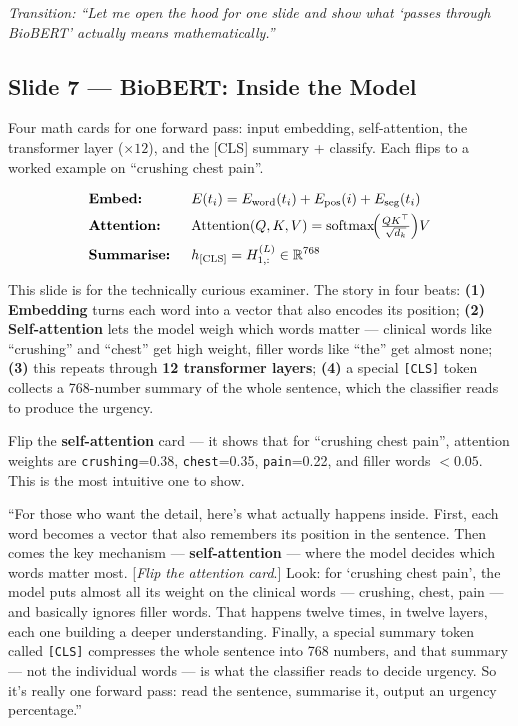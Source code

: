 \documentclass[11pt]{article}
\newcommand{\transition}[1]{\medskip\noindent\textit{\textcolor{mutel}{Transition: #1}}\medskip}
\newcommand{\route}[1]{{\small\texttt{\textcolor{mutel}{#1}}}}
\newcommand{\slide}[3]{%
  \subsection{Slide #1 --- #2}%
  \noindent\route{Route: #3}\par\smallskip}
\begin{document}
\transition{``Let me open the hood for one slide and show what `passes through BioBERT' actually means mathematically.''}

\slide{7}{BioBERT: Inside the Model}{/dashboard/math/biobert-inference}

\begin{onscreen}
Four math cards for one forward pass: input embedding, self-attention, the transformer layer ($\times 12$),
and the [CLS] summary + classify. Each flips to a worked example on ``crushing chest pain''.
\end{onscreen}

\begin{align*}
&\textbf{Embed: } && E(t_i) = E_{\text{word}}(t_i) + E_{\text{pos}}(i) + E_{\text{seg}}(t_i)\\
&\textbf{Attention: } && \mathrm{Attention}(Q,K,V) = \mathrm{softmax}\!\Bigl(\tfrac{QK^\top}{\sqrt{d_k}}\Bigr)V\\
&\textbf{Summarise: } && h_{\mathrm{[CLS]}} = H^{(L)}_{1,:}\in\mathbb{R}^{768}
\end{align*}

\begin{idea}
This slide is for the technically curious examiner. The story in four beats: \textbf{(1) Embedding} turns
each word into a vector that also encodes its position; \textbf{(2) Self-attention} lets the model weigh
which words matter --- clinical words like ``crushing'' and ``chest'' get high weight, filler words like
``the'' get almost none; \textbf{(3)} this repeats through \textbf{12 transformer layers}; \textbf{(4)} a
special \texttt{[CLS]} token collects a 768-number summary of the whole sentence, which the classifier
reads to produce the urgency.
\end{idea}

\begin{demo}
Flip the \textbf{self-attention} card --- it shows that for ``crushing chest pain'', attention weights are
\texttt{crushing}=0.38, \texttt{chest}=0.35, \texttt{pain}=0.22, and filler words $<0.05$. This is the
most intuitive one to show.
\end{demo}

\begin{saybox}
``For those who want the detail, here's what actually happens inside. First, each word becomes a vector
that also remembers its position in the sentence. Then comes the key mechanism --- \textbf{self-attention}
--- where the model decides which words matter most. [\emph{Flip the attention card}.] Look: for `crushing
chest pain', the model puts almost all its weight on the clinical words --- crushing, chest, pain --- and
basically ignores filler words. That happens twelve times, in twelve layers, each one building a deeper
understanding. Finally, a special summary token called \texttt{[CLS]} compresses the whole sentence into
768 numbers, and that summary --- not the individual words --- is what the classifier reads to decide
urgency. So it's really one forward pass: read the sentence, summarise it, output an urgency percentage.''
\end{saybox}
\end{document}
